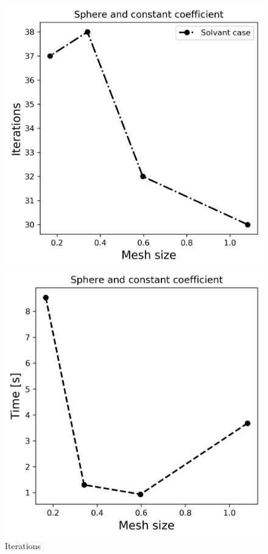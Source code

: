 \begin{itemize}
\begin{itemize}
\begin{figure}[!htb]
  \includegraphics[width=\linewidth]{BEM_BEM_Sphere_const_coeff_iter.png}
  \caption{Iterations}
\endminipage\hfill
{}%
  \includegraphics[width=\linewidth]{BEM_BEM_Sphere_const_coeff_time.png}

\end{figure}
\end{itemize}
\end{itemize}
